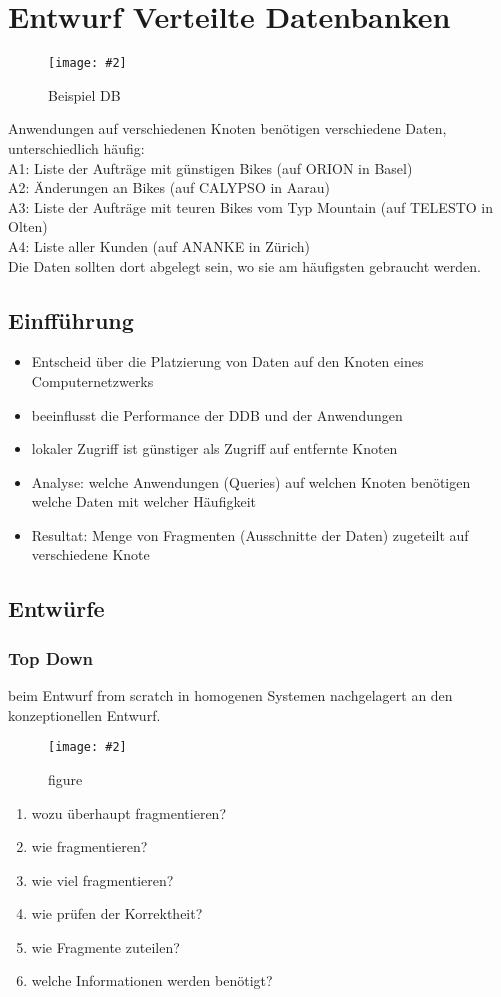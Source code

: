 \documentclass[a4paper,10pt,titlepage=false]{scrreprt}
\newcommand{\pic}[2][figure]{\begin{figure}[h]
 \centering
 \texttt{[image: \#2]}
 \caption{#1}
\end{figure}
}
\begin{document}
\chapter{Entwurf Verteilte Datenbanken}
\pic[Beispiel DB]{bspdb.png}
Anwendungen auf verschiedenen Knoten benötigen
verschiedene Daten, unterschiedlich häufig:\\
A1: Liste der Aufträge mit günstigen Bikes (auf ORION
in Basel)\\
A2: Änderungen an Bikes (auf CALYPSO in Aarau)\\
A3: Liste der Aufträge mit teuren Bikes vom Typ
Mountain (auf TELESTO in Olten)\\
A4: Liste aller Kunden (auf ANANKE in Zürich)\\
Die Daten sollten dort abgelegt sein, wo sie am häufigsten
gebraucht werden.\\

\section{Einfführung}
\begin{itemize}
\item Entscheid über die Platzierung von Daten auf den
Knoten eines Computernetzwerks
\item beeinflusst die Performance
der DDB und der Anwendungen
\item lokaler Zugriff ist günstiger
als Zugriff auf entfernte Knoten
\item Analyse:
\subitem welche Anwendungen (Queries)
\subitem auf welchen Knoten
\subitem benötigen welche Daten
\subitem mit welcher Häufigkeit
\item Resultat:
\subitem Menge von Fragmenten (Ausschnitte der Daten)
\subitem zugeteilt auf verschiedene Knote
\end{itemize}

\section{Entwürfe}
\subsection{Top Down}
beim Entwurf from scratch
in homogenen Systemen
nachgelagert an den konzeptionellen Entwurf.
\pic{bup.png}

\begin{enumerate}
\item wozu überhaupt fragmentieren?
\item  wie fragmentieren?
\item  wie viel fragmentieren?
\item  wie prüfen der Korrektheit?
\item  wie Fragmente zuteilen?
\item  welche Informationen werden benötigt?
\end{enumerate}
\end{document}
